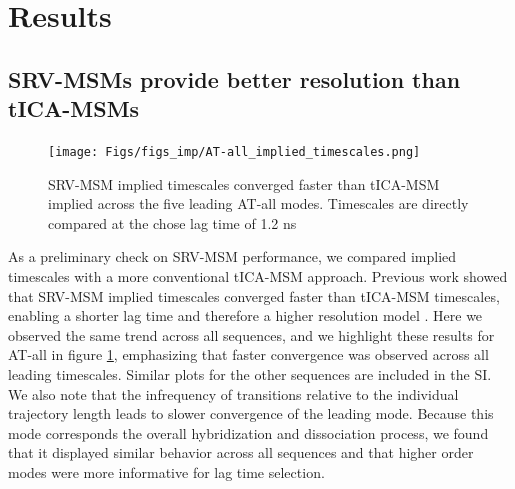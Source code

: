 \documentclass[journal=jpcbfk,manuscript=article]{achemso}
\begin{document}





\section{\label{sec:Results}Results}


\subsection{SRV-MSMs provide better resolution than tICA-MSMs} 

\begin{figure}[ht!]
	\begin{center}
        \texttt{[image: Figs/figs\_imp/AT-all\_implied\_timescales.png]}
        \caption{SRV-MSM implied timescales converged faster than tICA-MSM implied across the five leading AT-all modes. Timescales are directly compared at the chose lag time of 1.2 ns}
        \label{fig:AT-all_dynamic}
	\end{center}
\end{figure}

As a preliminary check on SRV-MSM performance, we compared implied timescales with a more conventional tICA-MSM approach. Previous work showed that SRV-MSM implied timescales converged faster than tICA-MSM timescales, enabling a shorter lag time and therefore a higher resolution model \citep{Sidky}. Here we observed the same trend across all sequences, and we highlight these results for AT-all in figure \ref{fig:AT-all_dynamic}, emphasizing that faster convergence was observed across all leading timescales. Similar plots for the other sequences are included in the SI. We also note that the infrequency of transitions relative to the individual trajectory length leads to slower convergence of the leading mode. Because this mode corresponds the overall hybridization and dissociation process, we found that it displayed similar behavior across all sequences and that higher order modes were more informative for lag time selection.
\end{document}

